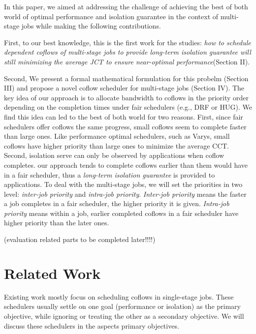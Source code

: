 \documentclass[10pt, conference, letterpaper]{IEEEtran}
\begin{document}
In this paper, we aimed at addressing the challenge of achieving the best of both world of optimal performance and isolation guarantee in the context of multi-stage jobs while making the following contributions. 

First, to our best knowledge, this is the first work for the studies: \emph{how to schedule dependent coflows of multi-stage jobs to provide long-term isolation guarantee will still minimizing the average JCT to ensure near-optimal performance}(Section II).

Second, We present a formal mathematical formulation for this probelm (Section III) and propose a novel coflow scheduler for multi-stage jobs (Section IV). The key idea of our approach is to allocate bandwidth to coflows in the priority order depending on the completion times under fair schedulers (e.g., DRF\cite{DRF} or HUG\cite{HUG}). We find this idea can led to the best of both world for two reasons. First, since fair schedulers offer coflows the same progress, small coflows seem to complete faster than large ones. Like performance optimal schedulers, such as Varys\cite{varys}, small coflows have higher priority than large ones to minimize the average CCT. Second, isolation serve can only be observed by applications when coflow completes. our approach tends to complete coflows earlier than them would have in a fair scheduler, thus a \emph{long-term isolation guarantee} is provided to applications. To deal with the multi-stage jobs, we will set the priorities in two level: \emph{inter-job priority} and \emph{intra-job priority}. \emph{Inter-job priority} means the faster a job completes in a fair scheduler, the higher priority it is given. \emph{Intra-job priority} means within a job, earlier completed coflows in a fair scheduler have higher priority than the later ones.

(evaluation related parts to be completed later!!!!)

\section{Related Work}
Existing work mostly focus on scheduling coflows in single-stage jobs. These schedulers usually settle on one goal (performance or isolation) as the primary objective, while ignoring or treating the other as a secondary objective. We will discuss these schedulers in the aspects primary objectives.
\end{document}

